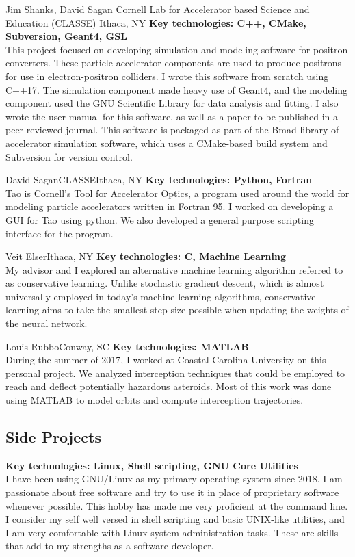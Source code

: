 \documentclass[11pt,a4paper,sans]{moderncv}        %
\newcommand{\techlist}[1]{\textbf{Key technologies: {#1}}\\}
\begin{document}
{Jim Shanks, David Sagan}
{Cornell Lab for Accelerator based Science and Education (CLASSE)}
{Ithaca, NY}{
\techlist{C++, CMake, Subversion, Geant4, GSL}
This project focused on developing simulation and modeling software for positron converters.
These particle accelerator components are used to produce positrons for use in electron-positron colliders.
I wrote this software from scratch using C++17.
The simulation component made heavy use of Geant4, and the modeling component used the GNU Scientific Library for data analysis and fitting.
I also wrote the user manual for this software, as well as a paper to be published in a peer reviewed journal.
This software is packaged as part of the Bmad library of accelerator simulation software, which uses a CMake-based build system and Subversion for version control.
}%

{David Sagan}{CLASSE}{Ithaca, NY}{
\techlist{Python, Fortran}
Tao is Cornell's Tool for Accelerator Optics, a program used around the world for modeling particle accelerators written in Fortran 95.
I worked on developing a GUI for Tao using python.
We also developed a general purpose scripting interface for the program.
}%

{Veit Elser}{Ithaca, NY}{}{
\techlist{C, Machine Learning}
My advisor and I explored an alternative machine learning algorithm referred to as conservative learning.
Unlike stochastic gradient descent, which is almost universally employed in today's machine learning algorithms, conservative learning aims to take the smallest step size possible when updating the weights of the neural network.
}%

{Louis Rubbo}{Conway, SC}{}{
\techlist{MATLAB}
During the summer of 2017, I worked at Coastal Carolina University on this personal project.
We analyzed interception techniques that could be employed to reach and deflect potentially hazardous asteroids.
Most of this work was done using MATLAB to model orbits and compute interception trajectories.
}%

\subsection{Side Projects}

{}{}{}{
\techlist{Linux, Shell scripting, GNU Core Utilities}
I have been using GNU/Linux as my primary operating system since 2018.
I am passionate about free software and try to use it in place of proprietary software whenever possible.
This hobby has made me very proficient at the command line.
I consider my self well versed in shell scripting and basic UNIX-like utilities, and I am very comfortable with Linux system administration tasks.
These are skills that add to my strengths as a software developer.
}%
\end{document}

